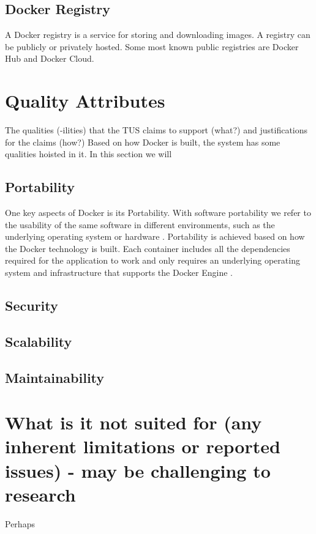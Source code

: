 \documentclass[fleqn,12pt]{olplainarticle}
\begin{document}
\subsection*{Docker Registry}

A Docker registry is a service for storing and downloading images\cite{aquasec:docker_architecture}. A registry can be publicly or privately hosted. Some most known public registries are Docker Hub and Docker Cloud.

\section*{Quality Attributes}

The qualities (-ilities) that the TUS claims to support (what?) and justifications for the claims (how?)
Based on how Docker is built, the system has some qualities hoisted in it. In this section we will 

\subsection*{Portability}
One key aspects of Docker is its Portability. With software portability we refer to the usability of the same software in different environments, such as the underlying operating system or hardware \citep{wiki:Software_portability}. Portability is achieved based on how the Docker technology is built. Each container includes all the dependencies required for the application to work and only requires an underlying operating system and infrastructure that supports the Docker Engine \citep{hy:DevOps_with_Docker}.
\subsection*{Security}
\subsection*{Scalability}
\subsection*{Maintainability}


\section*{What is it not suited for (any inherent limitations or reported issues) - may be challenging to research}

Perhaps
\end{document}
